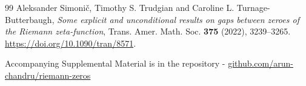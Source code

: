 \documentclass[11pt,reqno]{amsart}
\numberwithin{equation}{section}
\begin{document}
\begin{thebibliography}{99}
Aleksander Simoni\v{c}, Timothy S. Trudgian and Caroline L. Turnage-Butterbaugh,
\emph{Some explicit and unconditional results on gaps between zeroes
of the Riemann zeta-function},
Trans. Amer. Math. Soc. \textbf{375} (2022), 3239--3265.
\url{https://doi.org/10.1090/tran/8571}.

Accompanying Supplemental Material is in the repository - 
\href{https://github.com/arun-chandru/riemann-zeros}{github.com/arun-chandru/riemann-zeros}

\end{thebibliography}
\end{document}

